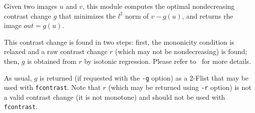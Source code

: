 Given two images $u$ and $v$, this module computes the optimal 
nondecreasing contrast change $g$ that minimizes the $l^2$ norm of $v-g(u)$,
and returns rhe image $out = g(u)$.

\medskip

This contrast change is found in two steps: first, the mononicity condition
is relaxed and a raw contrast change $r$ (which may not be nondecreasing) 
is found; then, $g$ is obtained from $r$ by isotonic regression.
Please refer to~\cite{moisan:modelling} for more details.

\medskip

As usual, $g$ is returned (if requested with the \verb+-g+ option)
as a 2-Flist that may be used with \verb+fcontrast+.
Note that $r$ (which may be returned using \verb+-r+ option) is not
a valid contrast change (it is not monotone) 
and should not be used with \verb+fcontrast+.
